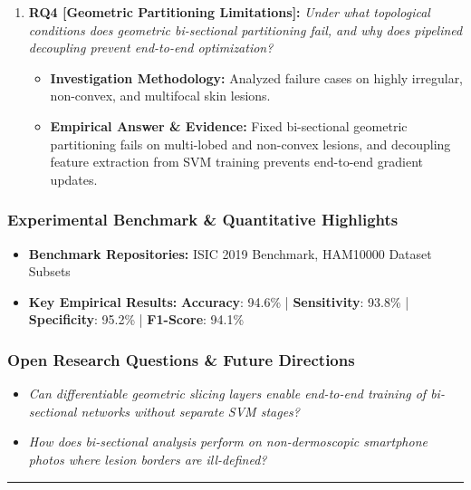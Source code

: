 \begin{enumerate}[label=\textbf{\arabic*.}, leftmargin=*]
\begin{itemize}[leftmargin=1.5em]
  \end{itemize}
  \item \textbf{RQ4 [Geometric Partitioning Limitations]:} \textit{Under what topological conditions does geometric bi-sectional partitioning fail, and why does pipelined decoupling prevent end-to-end optimization?}
  \begin{itemize}[leftmargin=1.5em]
    \item \textbf{Investigation Methodology:} Analyzed failure cases on highly irregular, non-convex, and multifocal skin lesions.
    \item \textbf{Empirical Answer \& Evidence:} Fixed bi-sectional geometric partitioning fails on multi-lobed and non-convex lesions, and decoupling feature extraction from SVM training prevents end-to-end gradient updates.
  \end{itemize}
\end{enumerate}

\subsubsection*{Experimental Benchmark \& Quantitative Highlights}
\begin{itemize}[leftmargin=*]
  \item \textbf{Benchmark Repositories:} ISIC 2019 Benchmark, HAM10000 Dataset Subsets
  \item \textbf{Key Empirical Results:} \textbf{Accuracy}: 94.6\% \quad | \quad \textbf{Sensitivity}: 93.8\% \quad | \quad \textbf{Specificity}: 95.2\% \quad | \quad \textbf{F1-Score}: 94.1\%
\end{itemize}

\subsubsection*{Open Research Questions \& Future Directions}
\begin{itemize}[leftmargin=*]
  \item \textit{Can differentiable geometric slicing layers enable end-to-end training of bi-sectional networks without separate SVM stages?}
  \item \textit{How does bi-sectional analysis perform on non-dermoscopic smartphone photos where lesion borders are ill-defined?}
\end{itemize}
\vspace{0.8em}\hrule\vspace{1.2em}

